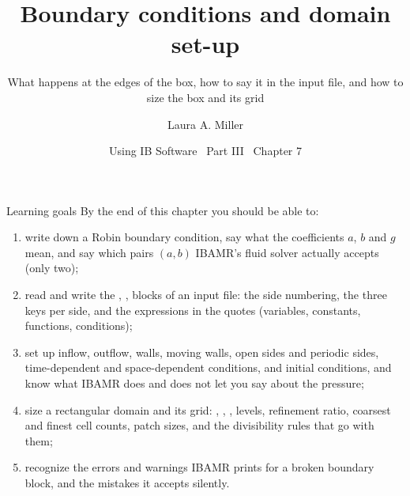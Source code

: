 \documentclass[aspectratio=169,11pt]{beamer}
\title[Boundary conditions and the domain]{Boundary conditions and domain set-up}
\subtitle{What happens at the edges of the box, how to say it in the input file, and how to size the box and its grid}
\author[Miller]{Laura A. Miller}
\institute[UArizona]{Department of Mathematics, University of Arizona}
\date{Using IB Software \textbullet\ Part III \textbullet\ Chapter 7}
\begin{document}
\begin{frame}[plain]
\end{frame}

\begin{frame}{Learning goals}
\label{fr:goals}
\small By the end of this chapter you should be able to:
\begin{enumerate}
  \item write down a Robin boundary condition, say what the coefficients $a$, $b$ and $g$ mean, and say which pairs $(a,b)$ IBAMR's fluid solver actually accepts (only two);
  \item read and write the , ,  blocks of an input file: the side numbering, the three keys per side, and the expressions in the quotes (variables, constants, functions, conditions);
  \item set up inflow, outflow, walls, moving walls, open sides and periodic sides, time-dependent and space-dependent conditions, and initial conditions, and know what IBAMR does and does not let you say about the pressure;
  \item size a rectangular domain and its grid: , , , levels, refinement ratio, coarsest and finest cell counts, patch sizes, and the divisibility rules that go with them;
  \item recognize the errors and warnings IBAMR prints for a broken boundary block, and the mistakes it accepts silently.
\end{enumerate}
\end{frame}
\end{document}

